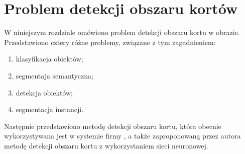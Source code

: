 \chapter{Problem detekcji obszaru kortów}

W niniejszym rozdziale omówiono problem detekcji obszaru kortu w obrazie.
Przedstawiono cztery różne problemy, związane z tym zagadnieniem:
\begin{enumerate}
  \item klasyfikacja obiektów;
  \item segmentaja semantyczna;
  \item detekcja obiektów;
  \item segmentacja instancji.
\end{enumerate}
Następnie przedstawiono metodę detekcji obszaru kortu, która obecnie wykorzystywana jest w systemie firmy \blue{}, a także zaproponowaną przez autora metodę detekcji obszaru kortu z wykorzystaniem sieci neuronowej.
